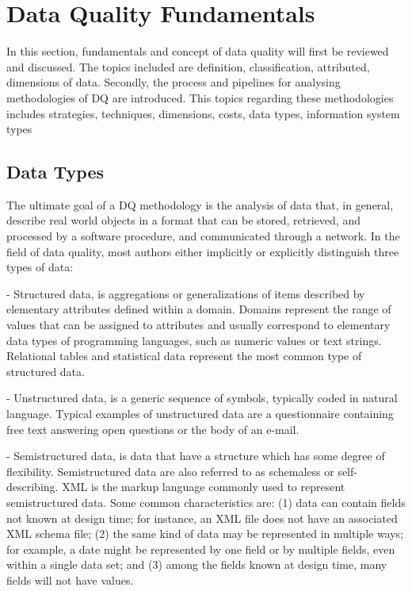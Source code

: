 \documentclass[pdftex,english,oribibl]{llncs}
\begin{document}
    \section{Data Quality Fundamentals}
    In this section, fundamentals and concept of data quality will first be reviewed and discussed.
    The topics included are definition, classification, attributed, dimensions of data.
    Secondly, the process and pipelines for analysing methodologies of DQ are introduced.
    This topics regarding these methodologies includes strategies, techniques, dimensions,
    costs, data types, information system types
    \subsection{Data Types}
    The ultimate goal of a DQ methodology is the analysis of data that, in general, describe real world objects in a format that can be stored, retrieved, and processed by a software procedure, and communicated through a network.
    In the field of data quality, most authors either implicitly or explicitly distinguish three types of data:

    - Structured data, is aggregations or generalizations of items described by elementary attributes defined within a domain.
    Domains represent the range of values that can be assigned to attributes and usually correspond to elementary data types of programming languages, such as numeric values or text strings.
    Relational tables and statistical data represent the most common type of structured data.

    - Unstructured data, is a generic sequence of symbols, typically coded in natural language.
    Typical examples of unstructured data are a questionnaire containing free text answering open questions or the body of an e-mail.

    - Semistructured data, is data that have a structure which has some degree of flexibility. Semistructured data are also referred to as schemaless or self-describing.
    XML is the markup language commonly used to represent semistructured data.
    Some common characteristics are:
    (1) data can contain fields not known at design time; for instance, an XML file does not have an associated XML schema file;
    (2) the same kind of data may be represented in multiple ways; for example, a date might be represented by one field or by multiple fields, even within a single data set; and
    (3) among the fields known at design time, many fields will not have values.
\end{document}
